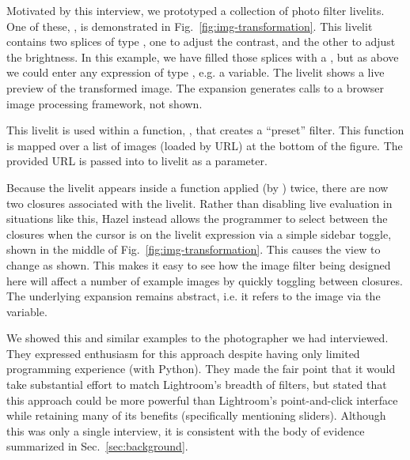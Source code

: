 
Motivated by this interview,
we prototyped a collection of photo filter livelits.
One of these, , is demonstrated in Fig.~\ref{fig:img-transformation}. 
This livelit contains two splices of type ,
one to adjust the contrast, and the other to adjust the brightness.
In this example, we have filled those splices with a , but
as above we could enter any expression of type , e.g. a variable.
The livelit shows a live preview of the transformed image.
The expansion generates calls to a browser image processing framework, 
not shown.

This livelit is used within a function, , that creates a ``preset'' filter. 
This function is mapped over a list of images (loaded by URL) at the bottom of the figure. 
The provided URL is passed into to livelit as a parameter.

Because the livelit appears inside a function applied (by ) twice, 
there are now two closures associated with the livelit. 
Rather than disabling live evaluation in situations like 
this, Hazel instead allows the programmer to select between the closures when 
the cursor is on the livelit expression via a simple sidebar toggle,
shown in the middle of Fig.~\ref{fig:img-transformation}.
This causes the view to change as shown. 
This makes it easy to see how the image filter being designed here will affect a
number of example images by quickly toggling between closures.
The underlying expansion remains abstract, i.e. it refers to the image via the  variable.

We showed this and similar examples to the photographer we had interviewed.
They expressed enthusiasm for this approach despite having only
limited programming experience (with Python). They made the fair point that it
would take substantial effort to match Lightroom's breadth of filters,
but stated that this approach could be more powerful than
Lightroom's point-and-click interface while retaining many of its benefits (specifically
mentioning sliders). Although this was only a single interview,
it is consistent with the body of evidence summarized in Sec.~\ref{sec:background}.


